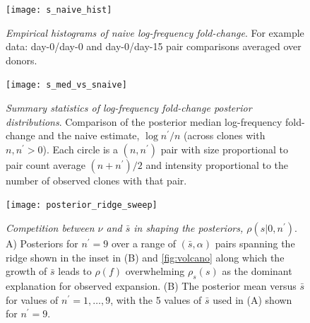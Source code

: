 \documentclass[pre,twocolumn,english,longbibliography]{revtex4}
\newcommand{\<}{\langle}
\renewcommand{\>}{\rangle}
\begin{document}
\begin{figure}
\texttt{[image: s\_naive\_hist]}
\centering{}
\caption{
\emph{Empirical histograms of naive log-frequency fold-change}. For example data: day-0/day-0 and day-0/day-15 pair comparisons averaged over donors.
\label{fig:SM_snaive_hists}
}
\end{figure}

\begin{figure}
\texttt{[image: s\_med\_vs\_snaive]}
\centering{}
\caption{
\emph{Summary statistics of log-frequency fold-change posterior distributions}. Comparison of the posterior median log-frequency fold-change and the naive estimate, $\log n^{\prime}/n$ (across clones with $n,n^{\prime}>0$). Each circle is a $(n,n^\prime)$ pair with size proportional to pair count average $(n+n^\prime)/2$ and intensity proportional to the number of observed clones with that pair.
\label{fig:SM_smed_snaive}
}
\end{figure}

\begin{figure}
\texttt{[image: posterior\_ridge\_sweep]}

\caption{
\emph{Competition between $\nu$ and $\bar{s}$ in shaping the posteriors, $\rho(s|0,n^\prime)$}. A) Posteriors for $n^\prime=9$ over a range of $(\bar{s},\alpha)$ pairs spanning the ridge shown in the inset in (B) and \cref{fig:volcano} along which the growth of $\bar{s}$ leads to $\rho(f)$ overwhelming $\rho_s(s)$ as the dominant explanation for observed expansion. (B) The posterior mean versus $\bar{s}$ for values of $n^\prime=1,\dots,9$, with the 5 values of $\bar{s}$ used in (A) shown for $n^\prime=9$.
\label{fig:posteriors}}
\end{figure}
\end{document}
